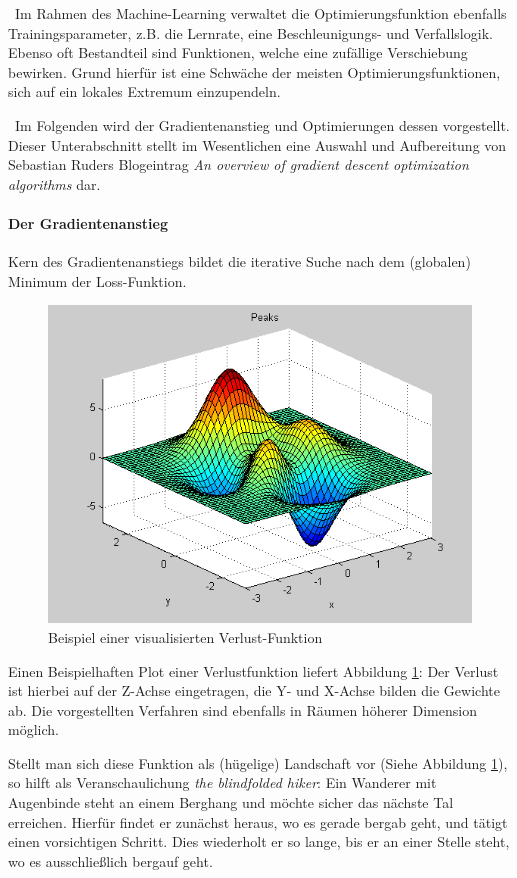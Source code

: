 ~\newline Im Rahmen des Machine-Learning verwaltet die Optimierungsfunktion ebenfalls Trainingsparameter, z.B. die Lernrate, eine Beschleunigungs- und Verfallslogik. Ebenso oft Bestandteil sind Funktionen, welche eine zufällige Verschiebung bewirken. Grund hierfür ist eine Schwäche der meisten Optimierungsfunktionen, sich auf ein lokales Extremum einzupendeln.

~\newline Im Folgenden wird der Gradientenanstieg und Optimierungen dessen vorgestellt. Dieser Unterabschnitt stellt im Wesentlichen eine Auswahl und Aufbereitung von Sebastian Ruders Blogeintrag \textit{An overview of gradient descent optimization algorithms} \cite{OptimizationFunction} dar.
\paragraph{Der Gradientenanstieg} Kern des Gradientenanstiegs bildet die iterative Suche nach dem (globalen) Minimum der Loss-Funktion. 
\begin{figure}[h]
	\begin{center}
		\includegraphics[width=0.6\linewidth]{Bilder/optimization}
		\caption[Loss-Function: \url{
			http://www.ahozer.com/research.html}]{Beispiel einer visualisierten Verlust-Funktion}
		\label{fig:Loss}
	\end{center}
\end{figure}
Einen Beispielhaften Plot einer Verlustfunktion liefert Abbildung \ref{fig:Loss}: Der Verlust ist hierbei auf der Z-Achse eingetragen, die Y- und X-Achse bilden die Gewichte ab. Die vorgestellten Verfahren sind ebenfalls in Räumen höherer Dimension möglich.

Stellt man sich diese Funktion als (hügelige) Landschaft vor (Siehe Abbildung \ref{fig:Loss}), so hilft als Veranschaulichung \textit{the blindfolded hiker}: Ein Wanderer mit Augenbinde steht an einem Berghang und möchte sicher das nächste Tal erreichen. Hierfür findet er zunächst heraus, wo es gerade bergab geht, und tätigt einen vorsichtigen Schritt. Dies wiederholt er so lange, bis er an einer Stelle steht, wo es ausschließlich bergauf geht.

